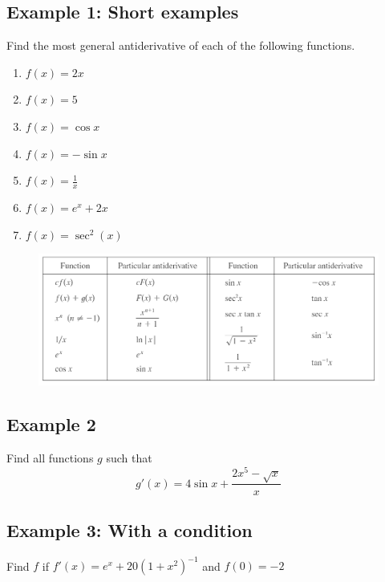 \documentclass[10pt]{book}
\theoremstyle{definition}
\begin{document}
\subsection*{Example 1: Short examples}
Find the most general antiderivative of each of the following functions.
 \begin{multicols}{2}
    \begin{enumerate}[label=(\alph*)]
        \item $f(x)=2x$\vspace{1cm}
        \item $f(x)=5$\vspace{1cm}
        \item $f(x)=\cos x$\vspace{1cm}
        \item $f(x)=-\sin x$\vspace{1cm}
        \item $\displaystyle f(x)=\frac{1}{x}$\vspace{1cm}
        \item $f(x)=e^x+2x$\vspace{1cm}
        \item $f(x)=\sec^2(x)$\vspace{1cm}
    \end{enumerate}
    \end{multicols}
\clearpage
\begin{figure}[ht]
    \centering
    \includegraphics{Basic-AntiRules.png}
\end{figure}
\subsection*{Example 2}
Find all functions $g$ such that 
\[
g'(x)=4\sin x+\frac{2x^5-\sqrt{x}}{x}
\]
\vspace{5cm}
\subsection*{Example 3: With a condition} Find $f$ if $f'(x)=e^x+20(1+x^2)^{-1}$ and $f(0)=-2$\vspace{5cm}
\clearpage
\end{document}
